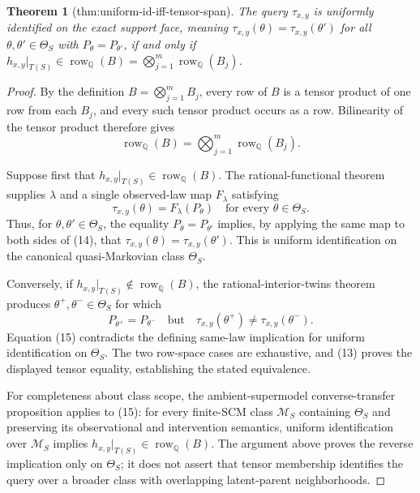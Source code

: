 \documentclass{article}
\newtheorem{theorem}{Theorem}
\begin{document}
\begin{theorem}[thm:uniform-id-iff-tensor-span]\label{thm:uniform-id-iff-tensor-span}
The query \(\tau_{x,y}\) is uniformly identified on the exact support face, meaning \(\tau_{x,y}(\theta)=\tau_{x,y}(\theta')\) for all \(\theta,\theta'\in\Theta_S\) with \(P_{\theta}=P_{\theta'}\), if and only if \(h_{x,y}|_{T(S)}\in\operatorname{row}_{\mathbb Q}(B)=\bigotimes_{j=1}^m\operatorname{row}_{\mathbb Q}(B_j)\).
\end{theorem}
\begin{proof}
By the definition \(B=\bigotimes_{j=1}^mB_j\), every row of \(B\) is a tensor product of one row from each \(B_j\), and every such tensor product occurs as a row.  Bilinearity of the tensor product therefore gives
\[
\operatorname{row}_{\mathbb Q}(B)
=\bigotimes_{j=1}^m\operatorname{row}_{\mathbb Q}(B_j).       \tag{13}
\]

Suppose first that \(h_{x,y}|_{T(S)}\in\operatorname{row}_{\mathbb Q}(B)\).  The rational-functional theorem supplies \(\lambda\) and a single observed-law map \(F_\lambda\) satisfying
\[
\tau_{x,y}(\theta)=F_\lambda(P_\theta)
\quad\text{for every }\theta\in\Theta_S.                    \tag{14}
\]
Thus, for \(\theta,\theta'\in\Theta_S\), the equality \(P_\theta=P_{\theta'}\) implies, by applying the same map to both sides of (14), that \(\tau_{x,y}(\theta)=\tau_{x,y}(\theta')\).  This is uniform identification on the canonical quasi-Markovian class \(\Theta_S\).

Conversely, if \(h_{x,y}|_{T(S)}\notin\operatorname{row}_{\mathbb Q}(B)\), the rational-interior-twins theorem produces \(\theta^+,\theta^-\in\Theta_S\) for which
\[
P_{\theta^+}=P_{\theta^-}
\quad\text{but}\quad
\tau_{x,y}(\theta^+)\ne\tau_{x,y}(\theta^-).                \tag{15}
\]
Equation (15) contradicts the defining same-law implication for uniform identification on \(\Theta_S\).  The two row-space cases are exhaustive, and (13) proves the displayed tensor equality, establishing the stated equivalence.

For completeness about class scope, the ambient-supermodel converse-transfer proposition applies to (15): for every finite-SCM class \(\mathcal M_S\) containing \(\Theta_S\) and preserving its observational and intervention semantics, uniform identification over \(\mathcal M_S\) implies \(h_{x,y}|_{T(S)}\in\operatorname{row}_{\mathbb Q}(B)\).  The argument above proves the reverse implication only on \(\Theta_S\); it does not assert that tensor membership identifies the query over a broader class with overlapping latent-parent neighborhoods.
\end{proof}
\end{document}
